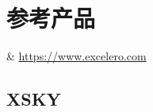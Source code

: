 \chapter{参考产品}

\begin{easylist}[itemize]
& \url{https://www.excelero.com}
\end{easylist}

\section{XSKY}

